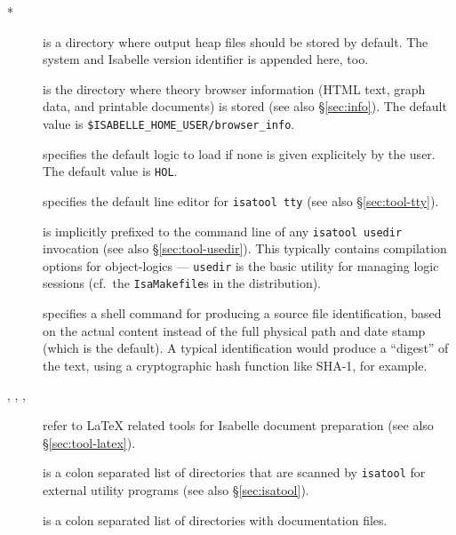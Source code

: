 \begin{description}
\item[*] is a directory where output heap files should
  be stored by default. The {\ML} system and Isabelle version identifier is
  appended here, too.
  
\item[] is the directory where theory browser
  information (HTML text, graph data, and printable documents) is stored (see
  also \S\ref{sec:info}).  The default value is
  \texttt{\$ISABELLE_HOME_USER/browser_info}.
  
\item[] specifies the default logic to load if none is
  given explicitely by the user.  The default value is \texttt{HOL}.
  
\item[] specifies the default line editor
  for \texttt{isatool tty} (see also \S\ref{sec:tool-tty}).

\item[] is implicitly prefixed to the command
  line of any \texttt{isatool usedir} invocation (see also
  \S\ref{sec:tool-usedir}). This typically contains compilation options for
  object-logics --- \texttt{usedir} is the basic utility for managing logic
  sessions (cf.\ the \texttt{IsaMakefile}s in the distribution).

\item[] specifies a shell command for
  producing a source file identification, based on the actual content
  instead of the full physical path and date stamp (which is the
  default). A typical identification would produce a ``digest'' of the
  text, using a cryptographic hash function like SHA-1, for example.
  
\item[, ,
  , ] refer to {\LaTeX} related
  tools for Isabelle document preparation (see also \S\ref{sec:tool-latex}).
  
\item[] is a colon separated list of directories that
  are scanned by \texttt{isatool} for external utility programs (see also
  \S\ref{sec:isatool}).
  
\item[] is a colon separated list of directories with
  documentation files.
  

\end{description}
